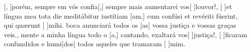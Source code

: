 {    {[, ]{po}rém, sempre em vós confia[,] sempre mais aumentarei vos[ ]{lou}{vor}!},
  {[ ]{et} língua mea tota die meditábitur iustítiam [am,] cum confúsi et revériti fúerint, qui quærunt [ ]{mi}hi.}%
    { boca anunciará todos os [as] vossa justiça e vossas graças veis.},
  {}%
    {mente a minha língua todo o [a,] cantando, exaltará vos[ ]{jus}{ti}ça!},
  {}%
    {[ ]{fi}caram confundidos e humi[dos] todos aqueles que tramaram [ ]{mim}.}
}